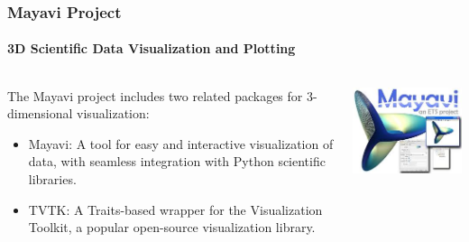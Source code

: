 \documentclass[compress=true]{beamer}
\begin{document}
\begin{frame}
	\frametitle{Mayavi Project}
	\framesubtitle{3D Scientific Data Visualization and Plotting}
	\begin{columns}
		\begin{column}{0.5\textwidth}
			The Mayavi project includes two related packages for 3-dimensional
			visualization:
			\begin{itemize}
				\item Mayavi: A tool for easy and interactive visualization of
					data, with seamless integration with Python scientific
					libraries.
				\item TVTK: A Traits-based wrapper for the Visualization
					Toolkit, a popular open-source visualization library.
			\end{itemize}
		\end{column}
		\begin{column}{0.5\textwidth}
			\includegraphics[height=0.4\textheight]{mayavi_1.png}
		\end{column}
	\end{columns}
\end{frame}
\end{document}
